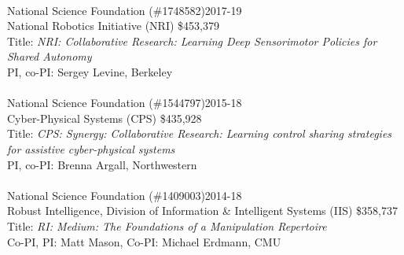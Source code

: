 \documentclass[10pt]{article}
\begin{document}
\\
National Science Foundation (\#1748582)\hfill 2017-19\\
National Robotics Initiative (NRI) \hfill \$453,379\\
Title: \textit{NRI: Collaborative Research: Learning Deep Sensorimotor Policies for Shared Autonomy}\\
PI, co-PI: Sergey Levine, Berkeley\\
\\
National Science Foundation (\#1544797)\hfill 2015-18\\
Cyber-Physical Systems (CPS) \hfill \$435,928\\
Title: \textit{CPS: Synergy: Collaborative Research: Learning control sharing strategies for assistive cyber-physical systems}\\
PI, co-PI: Brenna Argall, Northwestern\\
\\
National Science Foundation (\#1409003)\hfill 2014-18\\
Robust Intelligence, Division of Information \& Intelligent Systems (IIS) \hfill \$358,737\\
Title: \textit{RI: Medium: The Foundations of a Manipulation Repertoire}\\
Co-PI, PI: Matt Mason, Co-PI: Michael Erdmann, CMU\\
\end{document}
